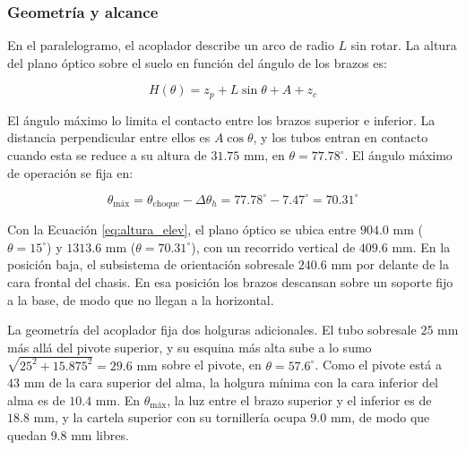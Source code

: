 \documentclass[../../General.tex]{subfiles}
\begin{document}
\subsubsection{Geometría y alcance}

En el paralelogramo, el acoplador describe un arco de radio $L$ sin rotar. La altura del plano óptico sobre el suelo en función del ángulo de los brazos es:

\begin{equation}\label{eq:altura_elev}
    H(\theta) = z_p + L \sin\theta + A + z_c
\end{equation}

El ángulo máximo lo limita el contacto entre los brazos superior e inferior. La distancia perpendicular entre ellos es $A\cos\theta$, y los tubos entran en contacto cuando esta se reduce a su altura de $31.75\text{ mm}$, en $\theta = 77.78^\circ$. El ángulo máximo de operación se fija en:

\begin{equation}\label{eq:theta_max_elev}
    \theta_{\text{máx}} = \theta_{\text{choque}} - \Delta\theta_{h} = 77.78^\circ - 7.47^\circ = 70.31^\circ
\end{equation}

Con la Ecuación \ref{eq:altura_elev}, el plano óptico se ubica entre $904.0\text{ mm}$ ($\theta = 15^\circ$) y $1313.6\text{ mm}$ ($\theta = 70.31^\circ$), con un recorrido vertical de $409.6\text{ mm}$. En la posición baja, el subsistema de orientación sobresale $240.6\text{ mm}$ por delante de la cara frontal del chasis. En esa posición los brazos descansan sobre un soporte fijo a la base, de modo que no llegan a la horizontal.

La geometría del acoplador fija dos holguras adicionales. El tubo sobresale $25\text{ mm}$ más allá del pivote superior, y su esquina más alta sube a lo sumo $\sqrt{25^2 + 15.875^2} = 29.6\text{ mm}$ sobre el pivote, en $\theta = 57.6^\circ$. Como el pivote está a $43\text{ mm}$ de la cara superior del alma, la holgura mínima con la cara inferior del alma es de $10.4\text{ mm}$. En $\theta_{\text{máx}}$, la luz entre el brazo superior y el inferior es de $18.8\text{ mm}$, y la cartela superior con su tornillería ocupa $9.0\text{ mm}$, de modo que quedan $9.8\text{ mm}$ libres.
\end{document}
